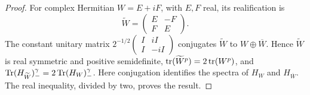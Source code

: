 \begin{proof}
For complex Hermitian $W=E+iF$, with $E,F$ real, its realification is
\begin{equation}\label{bound:realification}
 \widetilde W=\begin{pmatrix}E&-F\\F&E\end{pmatrix}.
\end{equation}
The constant unitary matrix
$2^{-1/2}\left(\begin{smallmatrix}I&iI\\I&-iI\end{smallmatrix}\right)$
conjugates $\widetilde W$ to $W\oplus\overline W$. Hence $\widetilde W$
is real symmetric and positive semidefinite,
$\operatorname{tr}(\widetilde W^p)=2\operatorname{tr}(W^p)$, and
$\operatorname{Tr}(H_{\widetilde W})_-^\gamma=2\operatorname{Tr}(H_W)_-^\gamma$.
Here conjugation identifies the spectra of $H_W$ and $H_{\overline W}$.
The real inequality, divided by two, proves the result.
\end{proof}
